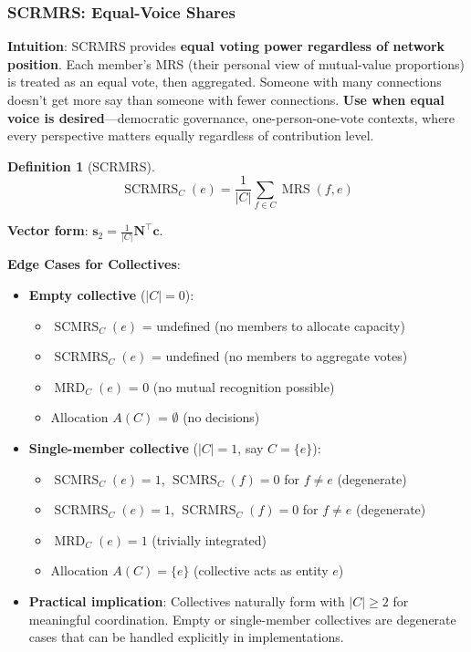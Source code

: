 \documentclass[11pt,a4paper]{article}
\theoremstyle{definition}
\newtheorem{definition}[theorem]{Definition}
\theoremstyle{remark}
\DeclareMathOperator{\MRS}{MRS}
\DeclareMathOperator{\SCMRS}{SCMRS}
\DeclareMathOperator{\SCRMRS}{SCRMRS}
\DeclareMathOperator{\MRD}{MRD}
\begin{document}
\subsubsection{SCRMRS: Equal-Voice Shares}

\textbf{Intuition}: SCRMRS provides \textbf{equal voting power regardless of network position}. Each member's MRS (their personal view of mutual-value proportions) is treated as an equal vote, then aggregated. Someone with many connections doesn't get more say than someone with fewer connections. \textbf{Use when equal voice is desired}---democratic governance, one-person-one-vote contexts, where every perspective matters equally regardless of contribution level.

\begin{definition}[SCRMRS]
\[ \SCRMRS_C(e) = \frac{1}{|C|} \sum_{f \in C} \MRS(f,e) \]
\end{definition}

\textbf{Vector form}: $\mathbf{s}_2 = \frac{1}{|C|}\mathbf{N}^\top \mathbf{c}$.

\textbf{Edge Cases for Collectives}:

\begin{itemize}
\item \textbf{Empty collective} ($|C| = 0$):
  \begin{itemize}
  \item $\SCMRS_C(e)$ = undefined (no members to allocate capacity)
  \item $\SCRMRS_C(e)$ = undefined (no members to aggregate votes)
  \item $\MRD_C(e)$ = 0 (no mutual recognition possible)
  \item Allocation $A(C)$ = $\emptyset$ (no decisions)
  \end{itemize}

\item \textbf{Single-member collective} ($|C| = 1$, say $C = \{e\}$):
  \begin{itemize}
  \item $\SCMRS_C(e) = 1$, $\SCMRS_C(f) = 0$ for $f \ne e$ (degenerate)
  \item $\SCRMRS_C(e) = 1$, $\SCRMRS_C(f) = 0$ for $f \ne e$ (degenerate)
  \item $\MRD_C(e) = 1$ (trivially integrated)
  \item Allocation $A(C) = \{e\}$ (collective acts as entity $e$)
  \end{itemize}

\item \textbf{Practical implication}: Collectives naturally form with $|C| \ge 2$ for meaningful coordination. Empty or single-member collectives are degenerate cases that can be handled explicitly in implementations.
\end{itemize}
\end{document}
